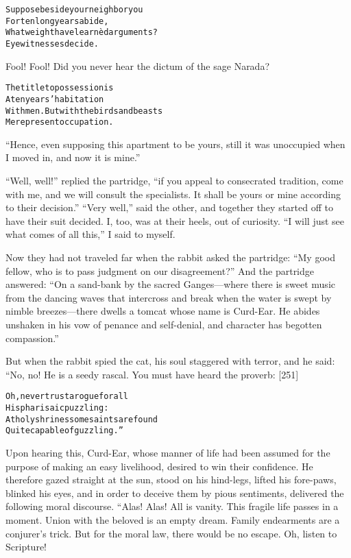 \documentclass{article}
\renewenvironment{verbatim}{\begin{alltt}\normalfont\begin{centering}}{\end{centering}\end{alltt}}
\begin{document}
\begin{verbatim}
Suppose beside your neighbor you
    For ten long years abide,
What weight have learnèd arguments?
    Eyewitnesses decide.
\end{verbatim}
Fool! Fool! Did you never hear the dictum of the sage Narada?

\begin{verbatim}
The title to possession is
    A ten years' habitation
With men. But with the birds and beasts
    Mere present occupation.
\end{verbatim}
``Hence, even supposing this apartment to be yours, still it was unoccupied when I moved in, and now it is mine.''

``Well, well!'' replied the partridge,
``if you appeal to consecrated tradition, come with me, and we will consult the specialists. It shall be yours or mine according to their decision.''
``Very well,'' said the other, and together they started off to
have their suit decided. I, too, was at their heels, out of
curiosity. ``I will just see what comes of all this,'' I said to
myself.

Now they had not traveled far when the rabbit asked the partridge:
``My good fellow, who is to pass judgment on our disagreement?''
And the partridge answered:
``On a sand-bank by the sacred Ganges---where there is sweet music from the dancing waves that intercross and break when the water is swept by nimble breezes---there dwells a tomcat whose name is Curd-Ear. He abides unshaken in his vow of penance and self-denial, and character has begotten compassion.''

But when the rabbit spied the cat, his soul staggered with terror,
and he said: “No, no! He is a seedy rascal. You must have heard the
proverb: [251]

\begin{verbatim}
Oh, never trust a rogue for all
    His pharisaic puzzling:
At holy shrines some saints are found
    Quite capable of guzzling.”
\end{verbatim}
Upon hearing this, Curd-Ear, whose manner of life had been assumed
for the purpose of making an easy livelihood, desired to win their
confidence. He therefore gazed straight at the sun, stood on his
hind-legs, lifted his fore-paws, blinked his eyes, and in order to
deceive them by pious sentiments, delivered the following moral
discourse. “Alas! Alas! All is vanity. This fragile life passes in
a moment. Union with the beloved is an empty dream. Family
endearments are a conjurer's trick. But for the moral law, there
would be no escape. Oh, listen to Scripture!
\end{document}
